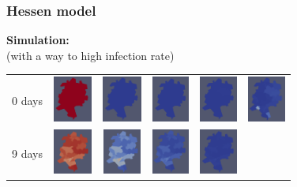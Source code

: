 \documentclass{beamer}
\begin{document}
\begin{frame}
\frametitle{Hessen model} 
	\textbf{Simulation:}\\(with a way to high infection rate)\\
	\hspace{3cm}
	\centering
	\begin{tabular}{c c c c c c }
		0 days
		& \includegraphics[height=1.5cm]{./images/0_0S.png}
		& \includegraphics[height=1.5cm]{./images/0_1E.png}
		& \includegraphics[height=1.5cm]{./images/0_2I.png}
		& \includegraphics[height=1.5cm]{./images/0_3R.png}
		& \includegraphics[height=1.5cm]{./images/0_4D.png}\\
		9 days
		& \includegraphics[height=1.5cm]{./images/12_0S.png}
		& \includegraphics[height=1.5cm]{./images/12_1E.png}
		& \includegraphics[height=1.5cm]{./images/12_2I.png}
		& \includegraphics[height=1.5cm]{./images/12_3R.png}

\end{tabular}
\end{frame}
\end{document}
